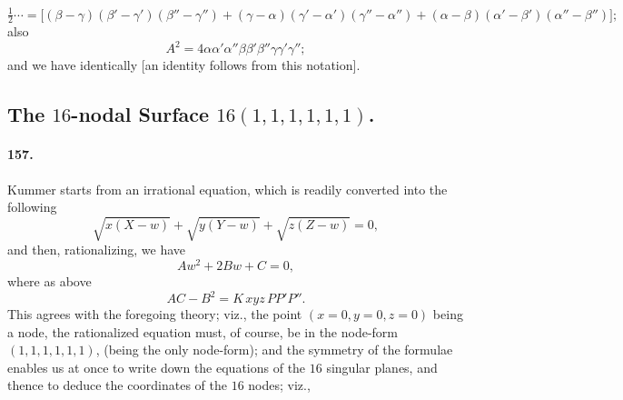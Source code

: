 \documentclass[11pt,a4paper]{article}
\begin{document}
\[
\tfrac{1}{2}\dotsb = \bigl[(\beta - \gamma)(\beta' - \gamma')(\beta'' - \gamma'')
+ (\gamma - \alpha)(\gamma' - \alpha')(\gamma'' - \alpha'')
+ (\alpha - \beta)(\alpha' - \beta')(\alpha'' - \beta'')\bigr];
\]
also
\[
A^2 = 4 \alpha \alpha' \alpha'' \beta \beta' \beta'' \gamma \gamma' \gamma'';
\]
and we have identically [an identity follows from this notation].

\subsection*{The $16$-nodal Surface $16(1, 1, 1, 1, 1, 1)$.}

\paragraph{157.}
Kummer starts from an irrational equation, which is readily converted
into the following
\[
\sqrt{x(X - w)} + \sqrt{y(Y - w)} + \sqrt{z(Z - w)} = 0,
\]
and then, rationalizing, we have
\[
Aw^2 + 2Bw + C = 0,
\]
where as above
\[
AC - B^2 = K\, xyz\, P P' P''.
\]
This agrees with the foregoing theory; viz., the point $(x = 0, y = 0, z = 0)$
being a node, the rationalized equation must, of course, be in the
node-form $(1, 1, 1, 1, 1, 1)$, (being the only node-form); and the
symmetry of the formulae enables us at once to write down the equations
of the $16$ singular planes, and thence to deduce the coordinates of the
$16$ nodes; viz.,

\medskip
\end{document}
